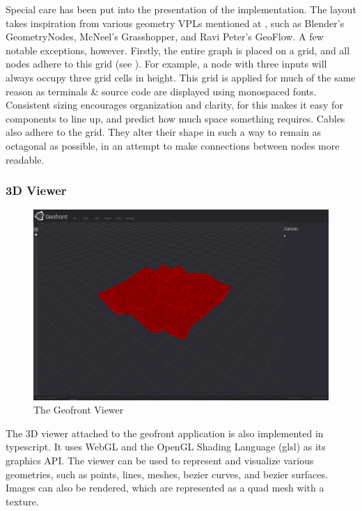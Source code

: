 Special care has been put into the presentation of the implementation.
The layout takes inspiration from various geometry VPLs mentioned at , such as Blender's GeometryNodes, McNeel's Grasshopper, and Ravi Peter's GeoFlow. 
A few notable exceptions, however. 
Firstly, the entire graph is placed on a grid, and all nodes adhere to this grid (see ). 
For example, a node with three inputs will always occupy three grid cells in height. 
This grid is applied for much of the same reason as terminals \& source code are displayed using monospaced fonts. 
Consistent sizing encourages organization and clarity, for this makes it easy for components to line up, and predict how much space something requires.  
Cables also adhere to the grid. They alter their shape in such a way to remain as octagonal as possible, in an attempt to make connections between nodes more readable.

\subsubsection*{3D Viewer}

\begin{figure}
  \centering
  \graphicspath{ {../../assets/images/implementation/} }
  \includegraphics[width=\linewidth]{viewer.png}
  \caption[Geofront viewer]{The Geofront Viewer}
  \label{fig:geofront-viewer}
\end{figure}

The 3D viewer attached to the geofront application is also implemented in typescript. 
It uses WebGL and the OpenGL Shading Language (glsl) as its graphics API. 
The viewer can be used to represent and visualize various geometries, such as points, lines, meshes, bezier curves, and bezier surfaces.
Images can also be rendered, which are represented as a quad mesh with a texture. 

